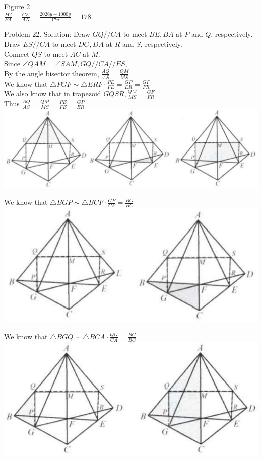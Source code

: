 \documentclass[10pt]{article}
\begin{document}
Figure 2\\
\(\frac{P C}{P A}=\frac{C E}{A N}=\frac{2026 y+1000 y}{17 y}=178\).

Problem 22. Solution:
Draw \(G Q / / C A\) to meet \(B E, B A\) at \(P\) and \(Q\), respectively.\\
Draw \(E S / / C A\) to meet \(D G, D A\) at \(R\) and \(S\), respectively.\\
Connect \(Q S\) to meet \(A C\) at \(M\).\\
Since \(\angle Q A M=\angle S A M, G Q / / C A / / E S\),\\
By the angle bisector theorem, \(\frac{A Q}{A S}=\frac{Q M}{M S}\)\\
We know that \(\triangle P G F \sim \triangle E R F \cdot \frac{P E}{F E}=\frac{G P}{E R}=\frac{G F}{F R}\)\\
We also know that in trapezoid \(G Q S R, \frac{Q M}{M S}=\frac{G F}{F R}\)\\
Thus \(\frac{A Q}{A S}=\frac{Q M}{M S}=\frac{P E}{F E}=\frac{G P}{E R}\)\\
\includegraphics[max width=\textwidth, center]{2025_04_17_97bc1f7e44d93c271a88g-143}

We know that \(\triangle B G P \sim \triangle B C F \cdot \frac{G P}{C F}=\frac{B G}{B C}\)\\
\includegraphics[max width=\textwidth, center]{2025_04_17_97bc1f7e44d93c271a88g-143(1)}


We know that \(\triangle B G Q \sim \triangle B C A \cdot \frac{Q G}{C A}=\frac{B G}{B C}\)\\
\includegraphics[max width=\textwidth, center]{2025_04_17_97bc1f7e44d93c271a88g-144(2)}
\end{document}
